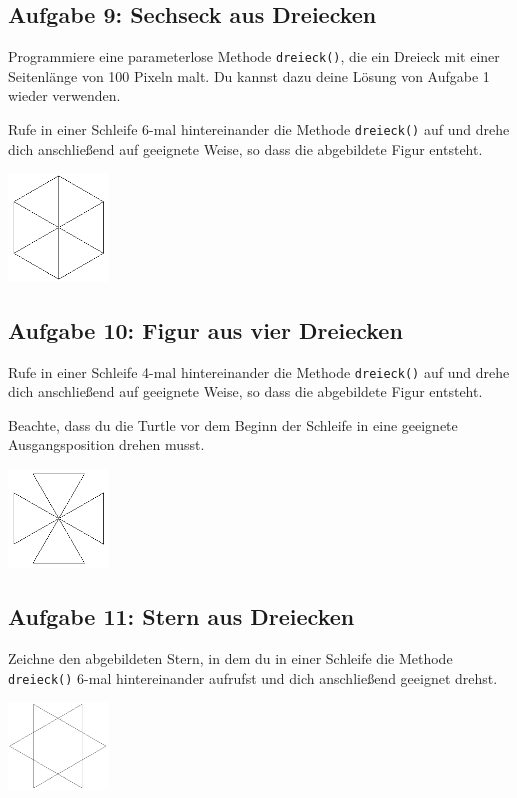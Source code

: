 \subsection{Aufgabe 9: Sechseck aus Dreiecken}

\begin{compactenum}[a)]
\item Programmiere eine parameterlose Methode \verb|dreieck()|, die ein Dreieck
mit einer Seitenlänge von 100 Pixeln malt. Du kannst dazu deine Lösung von
Aufgabe 1 wieder verwenden.

\item Rufe in einer Schleife 6-mal hintereinander die Methode \verb|dreieck()|
auf und drehe dich anschließend auf geeignete Weise, so dass die abgebildete
Figur entsteht.
\end{compactenum}

\begin{center}
\includegraphics[width=0.2\textwidth]{./inf/SEKII/05_Java_TurtleGrafik/Aufgabe9.png}
\end{center}


\subsection{Aufgabe 10: Figur aus vier Dreiecken}

Rufe in einer Schleife 4-mal hintereinander die Methode \verb|dreieck()| auf und
drehe dich anschließend auf geeignete Weise, so dass die abgebildete Figur entsteht. 

Beachte, dass du die Turtle vor dem Beginn der Schleife in eine geeignete
Ausgangsposition drehen musst.

\begin{center}
\includegraphics[width=0.2\textwidth]{./inf/SEKII/05_Java_TurtleGrafik/Aufgabe10.png}
\end{center}


\subsection{Aufgabe 11: Stern aus Dreiecken}

Zeichne den abgebildeten Stern, in dem du in einer Schleife die Methode
\verb|dreieck()| 6-mal hintereinander aufrufst und dich anschließend geeignet
drehst.

\begin{center}
\includegraphics[width=0.2\textwidth]{./inf/SEKII/05_Java_TurtleGrafik/Aufgabe11.png}
\end{center}
